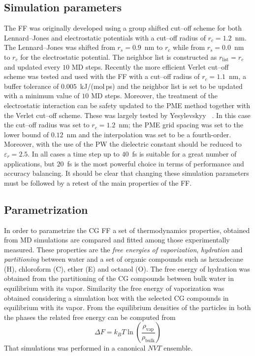 \subsection{Simulation parameters}
The \martini \ac{FF} was originally developed using a group shifted cut--off scheme for both Lennard--Jones and electrostatic potentials with a cut--off radius of $r_c = 1.2$~nm. The Lennard--Jones was shifted from $r_s = 0.9$~nm to $r_c$ while from $r_s = 0.0$~nm to $r_c$ for the electrostatic potential. The neighbor list is constructed as $r_\text{list} = r_c$ and updated every $10$ \ac{MD} steps. Recently the more efficient Verlet cut--off scheme was tested and used with the \martini \ac{FF} with a cut--off radius of $r_c = 1.1$~nm, a buffer tolerance of $0.005$~kJ/(mol\,ps) and the neighbor list is set to be updated with a minimum value of $10$ \ac{MD} steps.  Moreover, the treatment of the electrostatic interaction can be safety updated to the \ac{PME} method together with the Verlet cut--off scheme. These was largely tested by Yesylevskyy \etal\, \cite{PW}. In this case the cut--off radius was set to $r_c = 1.2$~nm; the \ac{PME} grid spacing was set to the lower bound of $0.12$~nm and the interpolation was set to be a fourth-order. Moreover, with the use of the \ac{PW} the dielectric constant should be reduced to $\varepsilon_r = 2.5$. In all cases a time step up to $40$~fs is suitable for a great number of applications, but $20$~fs is the most powerful choice in terms of performance and accuracy balancing. It should be clear that changing these simulation parameters must be followed by a retest of the main properties of the \martini \ac{FF}.

\subsection{Parametrization}
In order to parametrize the \martini \ac{CG} \ac{FF} a set of thermodynamics properties, obtained from \ac{MD} simulations are compared and fitted among those experimentally measured. These properties are the \textit{free energies of vaporization}, \textit{hydration} and \textit{partitioning} between water and a set of organic compounds such as hexadecane (H), chloroform (C), ether (E) and octanol (O). The free energy of hydration was obtained from the partitioning of the \ac{CG} compounds between bulk water in equilibrium with its vapor. Similarity the free energy of vaporization was obtained considering a simulation box with the selected \ac{CG} compounds in equilibrium with its vapor. From the equilibrium densities of the particles in both the phases the related free energy can be computed from
\begin{equation*}
	\Delta F = k_B T\ln \left ( \frac{\rho_{\text{vap}}}{\rho_{\text{bulk}}} \right ) 
\end{equation*}
That simulations was performed in a canonical $NVT$ ensemble.

